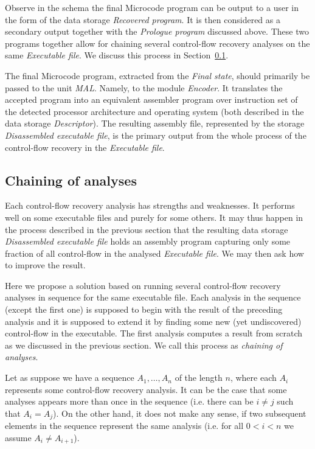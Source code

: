 \documentclass[10pt,twocolumn]{article}
\begin{document}
Observe in the schema the final Microcode program can be output to a user in the
form of the data storage \emph{Recovered program}. It is then considered as a
secondary output together with the \emph{Prologue program} discussed above.
These two programs together allow for chaining several control-flow recovery
analyses on the same \emph{Executable file}. We discuss this process in
Section~\ref{sec:overview:chaining}.

The final Microcode program, extracted from the \emph{Final state}, should
primarily be passed to the unit \emph{MAL}. Namely, to the module
\emph{Encoder}. It translates the accepted program into an equivalent assembler
program over instruction set of the detected processor architecture and
operating system (both described in the data storage \emph{Descriptor}). The
resulting assembly file, represented by the storage \emph{Disassembled
executable file}, is the primary output from the whole process of the
control-flow recovery in the \emph{Executable file}.


\subsection{Chaining of analyses}
\label{sec:overview:chaining}

Each control-flow recovery analysis has strengths and weaknesses. It performs
well on some executable files and purely for some others. It may thus happen in
the process described in the previous section that the resulting data storage
\emph{Disassembled executable file} holds an assembly program capturing only
some fraction of all control-flow in the analysed \emph{Executable file}. We may
then ask how to improve the result.

Here we propose a solution based on running several control-flow recovery
analyses in sequence for the same executable file. Each analysis in the sequence
(except the first one) is supposed to begin with the result of the preceding
analysis and it is supposed to extend it by finding some new (yet undiscovered)
control-flow in the executable. The first analysis computes a result from
scratch as we discussed in the previous section. We call this process as
\emph{chaining of analyses}.

Let as suppose we have a sequence $ A_1,\ldots,A_n $ of the length $ n $, where
each $ A_i $ represents some control-flow recovery analysis. It can be the case
that some analyses appears more than once in the sequence (i.e. there can be $ i
\ne j $ such that $ A_i = A_j $). On the other hand, it does not make any sense,
if two subsequent elements in the sequence represent the same analysis (i.e. for
all $ 0 < i < n $ we assume $ A_i \ne A_{i+1} $).
\end{document}
